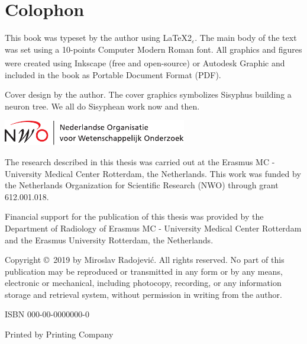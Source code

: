 %
%

\newpage
\setlength{\parindent}{0pt}
\thispagestyle{empty}

\section*{Colophon}

\bigskip
This book was typeset by the author using \LaTeX{}2{\LARGE $_{\varepsilon}$}. The main body of the text was set using a 10-points Computer Modern Roman font. All graphics and figures were created using Inkscape (free and open-source) or Autodesk \textsuperscript{\textregistered}Graphic and included in the book as Portable Document Format (PDF). %

\bigskip
Cover design by the author. The cover graphics symbolizes Sisyphus building a neuron tree. We all do Sisyphean work now and then.

\vfill
\includegraphics[height=3em]{./logos/nwo-nl}
\smallskip

The research described in this thesis was carried out at the Erasmus MC - University Medical Center Rotterdam, the Netherlands. This work was funded by the Netherlands Organization for Scientific Research (NWO) through grant 612.001.018.
\bigskip

Financial support for the publication of this thesis was provided by the Department of Radiology of Erasmus MC - University Medical Center Rotterdam and the Erasmus University Rotterdam, the Netherlands.

\bigskip

Copyright \copyright\ 2019 by Miroslav Radojevi\'{c}. All rights reserved. No part of this publication may be reproduced or transmitted in any form or by any means, electronic or mechanical, including photocopy, recording, or any information storage and retrieval system, without permission in writing from the author.

\bigskip
ISBN 000-00-0000000-0

\smallskip
Printed by Printing Company
\setlength{\parindent}{\myindent}


